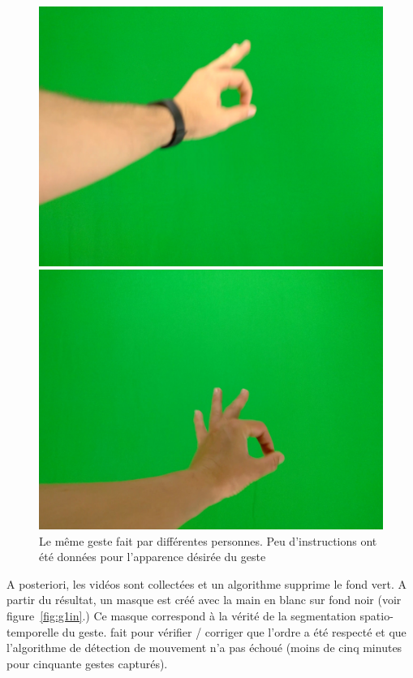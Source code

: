 \begin{figure}[htb]
\begin{minipage}[c]{0.19\linewidth}
   \end{minipage} 
   \begin{minipage}[c]{0.19\linewidth}
      \includegraphics[width=0.95\linewidth]{figures/g2-18.jpg}
   \end{minipage} 
   \begin{minipage}[c]{0.19\linewidth}
      \includegraphics[width=0.95\linewidth]{figures/g2-20.jpg}
   \end{minipage} 
   \caption{Le même geste fait par différentes personnes. Peu d'instructions ont été données pour l'apparence désirée du geste}
   \label{fig:g1m}
\end{figure}

A posteriori, les vidéos sont collectées et un algorithme supprime le fond vert. A partir du résultat, un masque est créé avec la main en blanc sur fond noir (voir figure~\ref{fig:g1in}.) Ce masque correspond à la vérité de la segmentation spatio-temporelle du geste. fait pour vérifier / corriger que l'ordre a été respecté et que l'algorithme de détection de mouvement n'a pas échoué (moins de cinq minutes pour cinquante gestes capturés).

